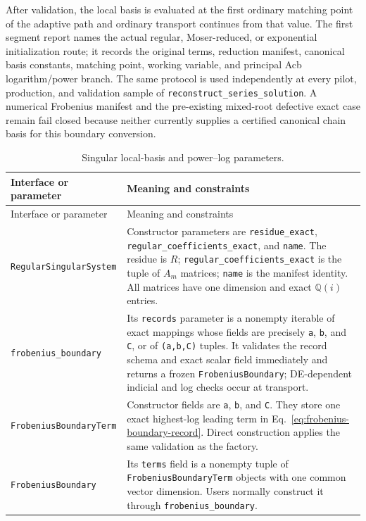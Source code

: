 \documentclass[11pt]{article}
\begin{document}
After validation, the local basis is evaluated at the first ordinary matching point of the
adaptive path and ordinary transport continues from that value.  The first segment report
names the actual regular, Moser-reduced, or exponential initialization route; it records the
original terms, reduction manifest, canonical basis constants, matching point, working
variable, and principal Acb
logarithm/power branch.  The same protocol is used independently at every pilot, production,
and validation sample of \texttt{reconstruct\_series\_solution}.  A numerical Frobenius
manifest and the pre-existing mixed-root defective exact case remain fail closed because
neither currently supplies a certified canonical chain basis for this boundary conversion.

\small
\begin{longtable}{L{0.36\textwidth}L{0.58\textwidth}}
\caption{Singular local-basis and power--log parameters.}\label{tab:frobenius-api}\\
\toprule
Interface or parameter & Meaning and constraints \\
\midrule
\endfirsthead
\toprule
Interface or parameter & Meaning and constraints \\
\midrule
\endhead
\texttt{RegularSingularSystem} & Constructor parameters are \texttt{residue\_exact},
\texttt{regular\_coefficients\_exact}, and \texttt{name}.  The residue is $R$;
\texttt{regular\_coefficients\_exact} is the tuple of $A_m$ matrices; \texttt{name} is the
manifest identity.  All matrices have one dimension and exact $\mathbb Q(i)$ entries. \\
\texttt{frobenius\_boundary} & Its \texttt{records} parameter is a nonempty iterable of
exact mappings whose fields are precisely \texttt{a}, \texttt{b}, and \texttt{C}, or of
\texttt{(a,b,C)} tuples.  It validates the record schema and exact scalar field immediately
and returns a frozen
\texttt{FrobeniusBoundary}; DE-dependent indicial and log checks occur at transport. \\
\texttt{FrobeniusBoundaryTerm} & Constructor fields are \texttt{a}, \texttt{b}, and
\texttt{C}.  They store one exact highest-log leading term in
Eq.~\eqref{eq:frobenius-boundary-record}.  Direct construction applies the same validation
as the factory. \\
\texttt{FrobeniusBoundary} & Its \texttt{terms} field is a nonempty tuple of
\texttt{FrobeniusBoundaryTerm} objects with one common vector dimension.  Users normally
construct it through \texttt{frobenius\_boundary}. \\

\end{longtable}
\end{document}
